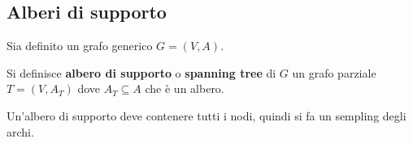 \subsection{Alberi di supporto}

Sia definito un grafo generico $G = (V, A)$.

Si definisce \textbf{albero di supporto} o \textbf{spanning tree} di $G$ un grafo parziale 
$T = (V, A_T)$ dove $A_T \subseteq A$ che è un albero.

Un'albero di supporto deve contenere tutti i nodi, quindi si fa un sempling degli archi.


